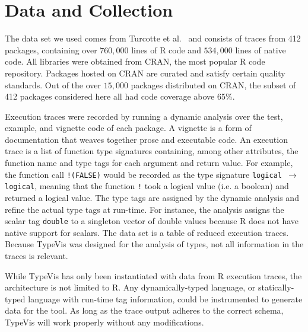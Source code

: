 \documentclass[review]{vgtc}                 %
\newcommand{\typevis}{{\sc TypeVis}\xspace}
\newcommand{\pkgNumAnalyzed}{412\xspace}
\begin{document}

\section{Data and Collection} \label{sec:data}

The data set we used comes from
Turcotte et al.~\cite{turcotte:2020}
and consists of traces from \pkgNumAnalyzed packages,
containing over $760,000$ lines of R code
and $534,000$ lines of native code.
All libraries were obtained from CRAN,
the most popular R code repository.
Packages hosted on CRAN are curated and satisfy
certain quality standards.
Out of the over $15,000$ packages
distributed on CRAN,
the subset of 412 packages considered here
all had code coverage above 65\%.

Execution traces were recorded by running a dynamic analysis
over the test, example, and vignette code of each package.
A vignette is a form of documentation that weaves
together prose and executable code.
An execution trace is a list of function type signatures
containing, among other attributes, the function name
and type tags for each argument and return value.
For example, the function call {\tt !(FALSE)}
would be recorded as the type signature {\tt logical $\to$ logical},
meaning that the function {\tt !} took a logical value (i.e. a boolean)
and returned a logical value.
The type tags are assigned by the dynamic analysis
and refine the actual type tags at run-time.
For instance, the analysis
assigns the scalar tag {\tt double} to a singleton vector of double values
because R does not have native support for scalars.
The data set is a table of reduced execution traces.
Because \typevis was designed for the analysis of types,
not all information in the traces is relevant.

While \typevis has only been instantiated with
data from R execution traces, the architecture is not limited to R.
Any dynamically-typed language, %
or statically-typed language with run-time tag information,
could be instrumented to generate data for the tool.
As long as the trace output adheres to
the correct schema, \typevis will work properly without any modifications.

\end{document}
